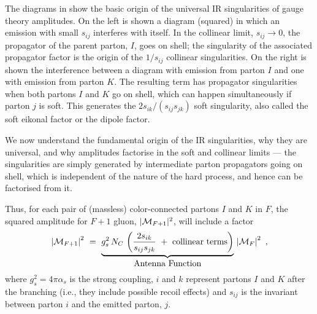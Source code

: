 The diagrams in  show the basic origin of the
universal IR singularities of gauge theory amplitudes. On the left is
shown a diagram (squared) in which an emission with small $s_{ij}$ 
interferes with itself. In the collinear limit, $s_{ij} \to 0$, the
propagator of the parent parton, $I$, goes on shell; the 
singularity of the associated propagator factor is the
origin of the $1/s_{ij}$ collinear singularities. 
On the right is
shown the interference between a diagram with emission from parton $I$
and one with emission 
from parton $K$. The resulting term has propagator singularities when
both partons $I$ and $K$ go on shell, which can happen simultaneously 
if parton $j$ is soft. 
This generates the $2s_{ik}/(s_{ij}s_{jk})$ soft 
singularity, also called the soft eikonal factor or the dipole factor.

We now understand the fundamental origin of the IR singularities, why
they are universal, and why amplitudes factorise in the soft and
collinear limits --- 
the singularities are simply 
generated by intermediate parton propagators going on shell, which is
independent of the nature of the hard process, and hence can be
factorised from it. 

Thus, for each pair of (massless) color-connected partons $I$ and $K$ in
$F$, the squared amplitude for $F+1$ gluon, 
$|{\cal M}_{F+1}|^2$, will include a factor
\begin{equation}
\left\vert{\cal M}_{F+1}\right\vert^2 \ = \ 
  \underbrace{g_s^2\,N_C\, \left(\frac{2s_{ik}}{s_{ij}s_{jk}}~+~\mbox{collinear
  terms}\right)}_{\mbox{Antenna Function}} \, \left\vert{\cal M}_F\right\vert^2~,\label{eq:eikonal2}
\end{equation} 
where $g_s^2 = 4\pi\alpha_s$ is the strong coupling,
$i$ and $k$ represent partons $I$ and $K$ after the branching (i.e.,
they include possible recoil effects) and $s_{ij}$ is
the invariant between parton $i$ and the emitted parton, $j$. 


